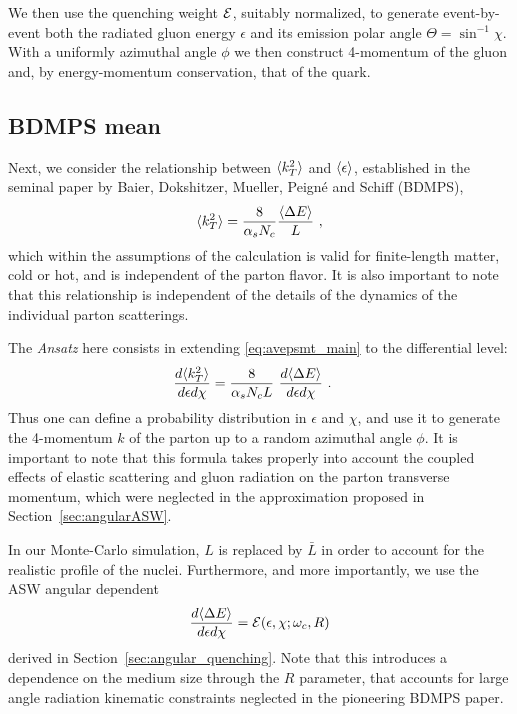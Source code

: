 We then use the quenching weight $\cal E$, suitably normalized, to generate event-by-event both the radiated gluon energy $\epsilon$ and its emission polar angle $\Theta = \sin^{-1} \chi$. With a uniformly azimuthal angle $\phi$ we then construct 4-momentum of the gluon and, by energy-momentum conservation, that of the quark.  


\subsection{BDMPS mean}

Next, we consider the relationship between $\langle k_T^2 \rangle$ and $\langle \epsilon \rangle$, 
established in the seminal paper \cite{Baier:1996sk} by Baier, Dokshitzer, Mueller, Peign\'e and Schiff (BDMPS),
\begin{align}
  \langle k_T^2 \rangle = \frac{8}{\alpha_s N_c} \frac{\langle \Delta E \rangle}{L} \ ,
 \label{eq:avepsmt_main}
\end{align}
which within the assumptions of the calculation is valid for finite-length matter, cold or hot, and is independent of the parton flavor. It is also important to note that this relationship is independent of the details of the dynamics of the individual parton scatterings.

The {\it Ansatz} here consists in extending \eqref{eq:avepsmt_main} to the differential level:
\begin{align}
  \frac{d\langle k_T^2 \rangle}{d\epsilon d\chi} & = \frac{8}{\alpha_s N_c L}
    \ \frac{d\langle \Delta E \rangle}{d\epsilon d\chi} \ .
\label{eq:enangdist}
\end{align}
Thus one can define a probability distribution in $\epsilon$ and $\chi$, and use it to generate the 4-momentum $k$ of the parton up to a random azimuthal angle $\phi$. It is important to note that this formula takes properly into account the coupled effects of elastic scattering and gluon radiation on the parton transverse momentum, which were neglected in the approximation proposed in Section~\ref{sec:angularASW}.

In our Monte-Carlo simulation, $L$ is replaced by $\bar L$ in order to account for the realistic profile of the nuclei. Furthermore, and more importantly, we use the ASW angular dependent
\begin{align}
  \frac{d\langle \Delta E \rangle}{d\epsilon d\chi} = {\mathcal E}(\epsilon,\chi;\omega_c,R)  
\end{align}
derived in Section~\ref{sec:angular_quenching}. Note that this introduces a dependence on the medium size through the $R$ parameter, that accounts for large angle radiation kinematic constraints neglected in the pioneering BDMPS paper.

